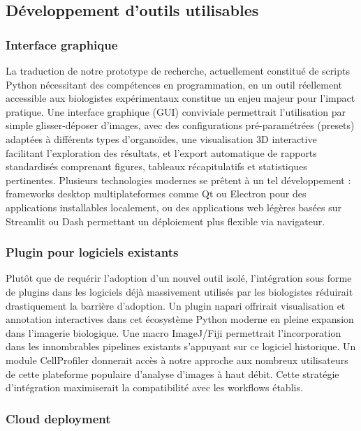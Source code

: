 \subsection{Développement d'outils utilisables}

\subsubsection{Interface graphique}

La traduction de notre prototype de recherche, actuellement constitué de scripts Python nécessitant des compétences en programmation, en un outil réellement accessible aux biologistes expérimentaux constitue un enjeu majeur pour l'impact pratique. Une interface graphique (GUI) conviviale permettrait l'utilisation par simple glisser-déposer d'images, avec des configurations pré-paramétrées (presets) adaptées à différents types d'organoïdes, une visualisation 3D interactive facilitant l'exploration des résultats, et l'export automatique de rapports standardisés comprenant figures, tableaux récapitulatifs et statistiques pertinentes. Plusieurs technologies modernes se prêtent à un tel développement : frameworks desktop multiplateformes comme Qt ou Electron pour des applications installables localement, ou des applications web légères basées sur Streamlit ou Dash permettant un déploiement plus flexible via navigateur.

\subsubsection{Plugin pour logiciels existants}

Plutôt que de requérir l'adoption d'un nouvel outil isolé, l'intégration sous forme de plugins dans les logiciels déjà massivement utilisés par les biologistes réduirait drastiquement la barrière d'adoption. Un plugin napari offrirait visualisation et annotation interactives dans cet écosystème Python moderne en pleine expansion dans l'imagerie biologique. Une macro ImageJ/Fiji permettrait l'incorporation dans les innombrables pipelines existants s'appuyant sur ce logiciel historique. Un module CellProfiler donnerait accès à notre approche aux nombreux utilisateurs de cette plateforme populaire d'analyse d'images à haut débit. Cette stratégie d'intégration maximiserait la compatibilité avec les workflows établis.

\subsubsection{Cloud deployment}

